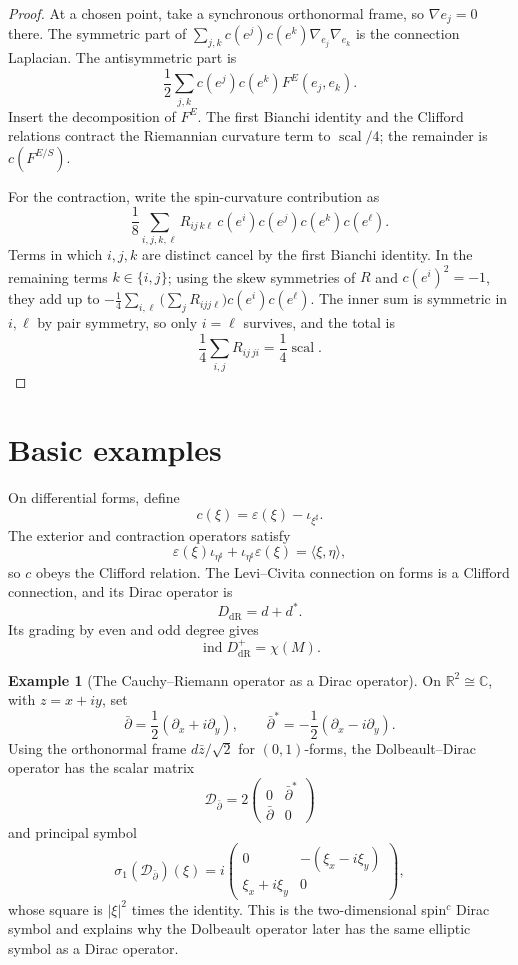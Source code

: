 \documentclass[11pt,oneside,reqno]{book}
\DeclareMathOperator{\ind}{ind}
\theoremstyle{plain}
\theoremstyle{definition}
\newtheorem{example}[theorem]{Example}
\theoremstyle{remark}
\begin{document}
\begin{proof}
At a chosen point, take a synchronous orthonormal frame, so
\(\nabla e_j=0\) there. The symmetric part of
\(\sum_{j,k}c(e^j)c(e^k)\nabla_{e_j}\nabla_{e_k}\) is the connection
Laplacian. The antisymmetric part is
\[
 \frac12\sum_{j,k}c(e^j)c(e^k)F^E(e_j,e_k).
\]
Insert the decomposition of \(F^E\). The first Bianchi identity and the
Clifford relations contract the Riemannian curvature term to
\(\operatorname{scal}/4\); the remainder is \(c(F^{E/S})\).

For the contraction, write the spin-curvature contribution as
\[
 \frac18\sum_{i,j,k,\ell}
 R_{ij\,k\ell}\,c(e^i)c(e^j)c(e^k)c(e^\ell).
\]
Terms in which \(i,j,k\) are distinct cancel by the first Bianchi
identity.  In the remaining terms \(k\in\{i,j\}\); using the skew symmetries
of \(R\) and \(c(e^i)^2=-1\), they add up to
\(-\frac14\sum_{i,\ell}\bigl(\sum_jR_{ijj\ell}\bigr)c(e^i)c(e^\ell)\).
The inner sum is symmetric in \(i,\ell\) by pair symmetry, so only
\(i=\ell\) survives, and the total is
\[
 \frac14\sum_{i,j}R_{ij\,ji}
 =\frac14\operatorname{scal}.
\]
\end{proof}

\section{Basic examples}

On differential forms, define
\[
 c(\xi)=\varepsilon(\xi)-\iota_{\xi^\sharp}.
\]
The exterior and contraction operators satisfy
\[
 \varepsilon(\xi)\iota_{\eta^\sharp}
 +\iota_{\eta^\sharp}\varepsilon(\xi)
 =
 \langle\xi,\eta\rangle,
\]
so \(c\) obeys the Clifford relation. The Levi--Civita connection on forms
is a Clifford connection, and its Dirac operator is
\[
 D_{\mathrm{dR}}=d+d^*.
\]
Its grading by even and odd degree gives
\[
 \ind D_{\mathrm{dR}}^+=\chi(M).
\]

\begin{example}[The Cauchy--Riemann operator as a Dirac operator]
On \(\mathbb R^2\cong\mathbb C\), with \(z=x+iy\), set
\[
 \bar\partial=\frac12(\partial_x+i\partial_y),
 \qquad
 \bar\partial^*=-\frac12(\partial_x-i\partial_y).
\]
Using the orthonormal frame \(d\bar z/\sqrt2\) for \((0,1)\)-forms, the
Dolbeault--Dirac operator has the scalar matrix
\[
 \mathcal D_{\bar\partial}
 =2
 \begin{pmatrix}
 0&\bar\partial^*\\
 \bar\partial&0
 \end{pmatrix}
\]
and principal symbol
 \[
 \sigma_1(\mathcal D_{\bar\partial})(\xi)
 =i
 \begin{pmatrix}
 0&-(\xi_x-i\xi_y)\\
 \xi_x+i\xi_y&0
 \end{pmatrix},
\]
whose square is \(|\xi|^2\) times the identity. This is the
two-dimensional spin\(^{c}\) Dirac symbol and explains why the Dolbeault
operator later has the same elliptic symbol as a Dirac operator.
\end{example}
\end{document}
